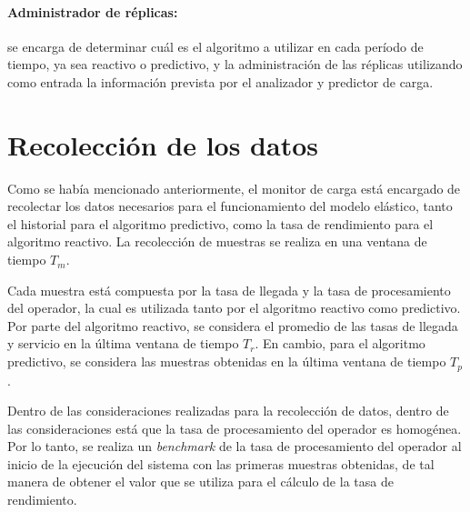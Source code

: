 \paragraph{Administrador de réplicas:} se encarga de determinar cuál es el algoritmo a utilizar en cada período de tiempo, ya sea reactivo o predictivo, y la administración de las réplicas utilizando como entrada la información prevista por el analizador y predictor de carga.


\section{Recolección de los datos}

Como se había mencionado anteriormente, el monitor de carga está encargado de recolectar los datos necesarios para el funcionamiento del modelo elástico, tanto el historial para el algoritmo predictivo, como la tasa de rendimiento para el algoritmo reactivo. La recolección de muestras se realiza en una ventana de tiempo $T_m$.


\normalsize{Cada muestra está compuesta por la tasa de llegada y la tasa de procesamiento del operador, la cual es utilizada tanto por el algoritmo reactivo como predictivo. Por parte del algoritmo reactivo, se considera el promedio de las tasas de llegada y servicio en la última ventana de tiempo $T_r$. En cambio, para el algoritmo predictivo, se considera las muestras obtenidas en la última ventana de tiempo $T_p$.

Dentro de las consideraciones realizadas para la recolección de datos, dentro de las consideraciones está que la tasa de procesamiento del operador es homogénea. Por lo tanto, se realiza un \textit{benchmark} de la tasa de procesamiento del operador al inicio de la ejecución del sistema con las primeras muestras obtenidas, de tal manera de obtener el valor que se utiliza para el cálculo de la tasa de rendimiento.}

